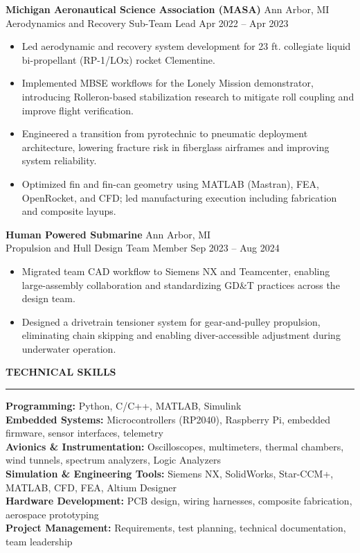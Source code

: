 \documentclass[10pt]{article}
\newcommand{\ressection}[1]{
  \vspace{0.12em}
  {\large\bfseries #1}\par
  \vspace{0.05em}\hrule\vspace{0.12em}
}
\begin{document}
{\bfseries Michigan Aeronautical Science Association (MASA)} \hfill Ann Arbor, MI \\
Aerodynamics and Recovery Sub-Team Lead \hfill Apr 2022 -- Apr 2023
\begin{itemize}
  \item Led aerodynamic and recovery system development for 23 ft. collegiate liquid bi-propellant (RP-1/LOx) rocket Clementine.
  \item Implemented MBSE workflows for the Lonely Mission demonstrator, introducing Rolleron-based stabilization research to mitigate roll coupling and improve flight verification.
  \item Engineered a transition from pyrotechnic to pneumatic deployment architecture, lowering fracture risk in fiberglass airframes and improving system reliability.
  \item Optimized fin and fin-can geometry using MATLAB (Mastran), FEA, OpenRocket, and CFD; led manufacturing execution including fabrication and composite layups.
\end{itemize}

{\bfseries Human Powered Submarine} \hfill Ann Arbor, MI \\
Propulsion and Hull Design Team Member \hfill Sep 2023 -- Aug 2024
\begin{itemize}
  \item Migrated team CAD workflow to Siemens NX and Teamcenter, enabling large-assembly collaboration and standardizing GD\&T practices across the design team.
  \item Designed a drivetrain tensioner system for gear-and-pulley propulsion, eliminating chain skipping and enabling diver-accessible adjustment during underwater operation.
\end{itemize}

\ressection{TECHNICAL SKILLS}

\textbf{Programming:} Python, C/C++, MATLAB, Simulink \\
\textbf{Embedded Systems:} Microcontrollers (RP2040), Raspberry Pi, embedded firmware, sensor interfaces, telemetry \\
\textbf{Avionics \& Instrumentation:} Oscilloscopes, multimeters, thermal chambers, wind tunnels, spectrum analyzers, Logic Analyzers \\
\textbf{Simulation \& Engineering Tools:} Siemens NX, SolidWorks, Star-CCM+, MATLAB, CFD, FEA, Altium Designer \\
\textbf{Hardware Development:} PCB design, wiring harnesses, composite fabrication, aerospace prototyping \\
\textbf{Project Management:} Requirements, test planning, technical documentation, team leadership
\end{document}
